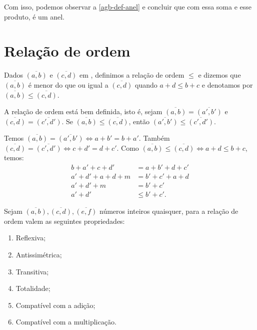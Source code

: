 \documentclass[../main.tex]{subfiles}
\begin{document}
Com isso, podemos observar a \cref{agb-def-anel} e concluir que \Z com essa soma e esse produto, é um anel.

\section{Relação de ordem}
\begin{defi}
    Dados $\overline{(a,b)}$ e $\overline{(c,d)}$ em \Z, definimos a relação de ordem $\leq$ e dizemos que $\overline{(a,b)}$ é menor do que ou igual a $\overline{(c,d)}$ quando $a+d \leq b+c$ e denotamos por $\overline{(a,b)} \leq \overline{(c,d)}$.
\end{defi}

\begin{prop}
    A relação de ordem está bem definida, isto é, sejam $\overline{(a,b)} = \overline{(a',b')}$ e $\overline{(c,d)} = \overline{(c',d')}$. Se $\overline{(a,b)} \leq \overline{(c,d)}$, então $\overline{(a',b')} \leq \overline{(c',d')}$.
\end{prop}
\begin{dem}
    Temos $\overline{(a,b)} = \overline{(a',b')} \iff a+b' = b+a'$. 
    Também $\overline{(c,d)} = \overline{(c',d')} \iff c+d' = d+c'$. 
    Como $\overline{(a,b)} \leq \overline{(c,d)} \iff a+d \leq b+c$, temos:
    \begin{align*}
        b+a'+c+d' &= a+b' + d+c' \\
        a'+d' + a+d + m &= b' + c' + a + d \\
        a'+d' + m &= b' + c'  \\
        a'+d' & \leq b'+c'.
    \end{align*}
     
\end{dem}
\begin{prop}{Sejam $\overline{(a,b)}, \overline{(c,d)}, \overline{(e,f)}$ números inteiros quaisquer, para a relação de ordem valem as seguintes propriedades:}
    \begin{enumerate}[label=(\roman*)]
        \item Reflexiva;
        \item Antissimétrica;
        \item Transitiva;
        \item Totalidade;
        \item Compatível com a adição;
        \item Compatível com a multiplicação.
    \end{enumerate}
\end{prop}
\end{document}
